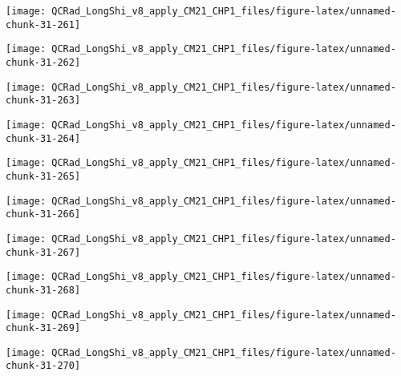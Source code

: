 \documentclass[
  10pt,
  a4paper,oneside]{article}
\begin{document}
\begin{center}\texttt{[image: QCRad\_LongShi\_v8\_apply\_CM21\_CHP1\_files/figure-latex/unnamed-chunk-31-261]} \end{center}

\begin{center}\texttt{[image: QCRad\_LongShi\_v8\_apply\_CM21\_CHP1\_files/figure-latex/unnamed-chunk-31-262]} \end{center}

\begin{center}\texttt{[image: QCRad\_LongShi\_v8\_apply\_CM21\_CHP1\_files/figure-latex/unnamed-chunk-31-263]} \end{center}

\begin{center}\texttt{[image: QCRad\_LongShi\_v8\_apply\_CM21\_CHP1\_files/figure-latex/unnamed-chunk-31-264]} \end{center}

\begin{center}\texttt{[image: QCRad\_LongShi\_v8\_apply\_CM21\_CHP1\_files/figure-latex/unnamed-chunk-31-265]} \end{center}

\begin{center}\texttt{[image: QCRad\_LongShi\_v8\_apply\_CM21\_CHP1\_files/figure-latex/unnamed-chunk-31-266]} \end{center}

\begin{center}\texttt{[image: QCRad\_LongShi\_v8\_apply\_CM21\_CHP1\_files/figure-latex/unnamed-chunk-31-267]} \end{center}

\begin{center}\texttt{[image: QCRad\_LongShi\_v8\_apply\_CM21\_CHP1\_files/figure-latex/unnamed-chunk-31-268]} \end{center}

\begin{center}\texttt{[image: QCRad\_LongShi\_v8\_apply\_CM21\_CHP1\_files/figure-latex/unnamed-chunk-31-269]} \end{center}

\begin{center}\texttt{[image: QCRad\_LongShi\_v8\_apply\_CM21\_CHP1\_files/figure-latex/unnamed-chunk-31-270]} \end{center}
\end{document}
